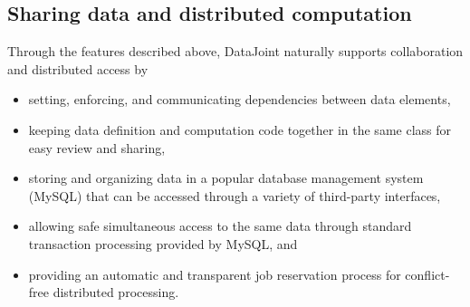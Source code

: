 \subsection*{Sharing data and distributed computation}
Through the features described above, DataJoint naturally supports collaboration and distributed access by
\begin{itemize}
\item setting, enforcing, and communicating dependencies between data elements,
\item keeping data definition and computation code together in the same class for easy review and sharing,
\item storing and organizing data in a popular database management system (MySQL) that can be accessed through a variety of third-party interfaces,
\item allowing safe simultaneous access to the same data through standard transaction processing provided by MySQL, and
\item providing an automatic and transparent job reservation process for conflict-free distributed processing.
\end{itemize}
